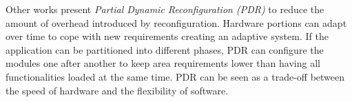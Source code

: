 Other works present \emph{Partial Dynamic Reconfiguration (PDR)} \cite{reconfigurable} to reduce the amount of overhead introduced by reconfiguration. Hardware portions can adapt over time to cope with new requirements creating an adaptive system. If the application can be partitioned into different phases, PDR can configure the modules one after another to keep area requirements lower than having all functionalities loaded at the same time. PDR can be seen as a trade-off between the speed of hardware and the flexibility of software.  